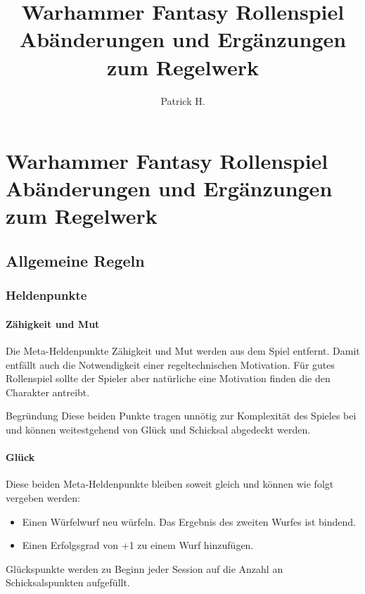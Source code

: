 \documentclass[a4paper,10pt,twoside,twocolumn,openany,nodeprecatedcode,bg=print]{dndbook}
\title{
  Warhammer Fantasy Rollenspiel\newline
  \large Abänderungen und Ergänzungen zum Regelwerk
  }
\author{Patrick H.}
\date{}
\begin{document}


\part*{Warhammer Fantasy Rollenspiel\newline
  \large{Abänderungen und Ergänzungen zum Regelwerk}\newline
}
\vspace{1em}



\chapter{Allgemeine Regeln}
\section{Heldenpunkte}
\subsection{Zähigkeit und Mut}
Die Meta-Heldenpunkte Zähigkeit und Mut werden aus dem Spiel entfernt.
Damit entfällt auch die Notwendigkeit einer regeltechnischen Motivation.
Für gutes Rollenspiel sollte der Spieler aber natürliche eine Motivation finden die den Charakter antreibt.

\begin{DndComment}{Begründung}
  Diese beiden Punkte tragen unnötig zur Komplexität des Spieles bei und können weitestgehend von Glück und Schicksal abgedeckt werden.
\end{DndComment}

\subsection{Glück}
Diese beiden Meta-Heldenpunkte bleiben soweit gleich und können wie folgt vergeben werden:
\begin{itemize}
  \item Einen Würfelwurf neu würfeln. Das Ergebnis des zweiten Wurfes ist bindend.
  \item Einen Erfolgsgrad von +1 zu einem Wurf hinzufügen.
\end{itemize}
Glückspunkte werden zu Beginn jeder Session auf die Anzahl an Schicksalspunkten aufgefüllt.
\end{document}
